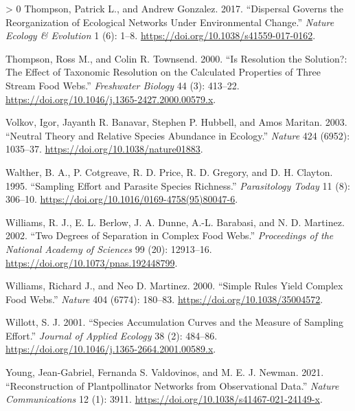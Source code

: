 \documentclass[11pt]{article}
\newlength{\cslhangindent}
\newenvironment{CSLReferences}[3] %
 {%
  \setlength{\parindent}{0pt}
  \ifodd #1 \everypar{\setlength{\hangindent}{\cslhangindent}}\ignorespaces\fi
  \ifnum #2 > 0
  \setlength{\parskip}{#2\baselineskip}
  \fi
 }%
 {}
\begin{document}
\begin{CSLReferences}{1}{0}
\leavevmode\hypertarget{ref-Thompson2017DisGov}{}%
Thompson, Patrick L., and Andrew Gonzalez. 2017. {``Dispersal Governs
the Reorganization of Ecological Networks Under Environmental Change.''}
\emph{Nature Ecology \& Evolution} 1 (6): 1--8.
\url{https://doi.org/10.1038/s41559-017-0162}.

\leavevmode\hypertarget{ref-Thompson2000ResSol}{}%
Thompson, Ross M., and Colin R. Townsend. 2000. {``Is Resolution the
Solution?: The Effect of Taxonomic Resolution on the Calculated
Properties of Three Stream Food Webs.''} \emph{Freshwater Biology} 44
(3): 413--22. \url{https://doi.org/10.1046/j.1365-2427.2000.00579.x}.

\leavevmode\hypertarget{ref-Volkov2003NeuThe}{}%
Volkov, Igor, Jayanth R. Banavar, Stephen P. Hubbell, and Amos Maritan.
2003. {``Neutral Theory and Relative Species Abundance in Ecology.''}
\emph{Nature} 424 (6952): 1035--37.
\url{https://doi.org/10.1038/nature01883}.

\leavevmode\hypertarget{ref-Walther1995SamEff}{}%
Walther, B. A., P. Cotgreave, R. D. Price, R. D. Gregory, and D. H.
Clayton. 1995. {``Sampling Effort and Parasite Species Richness.''}
\emph{Parasitology Today} 11 (8): 306--10.
\url{https://doi.org/10.1016/0169-4758(95)80047-6}.

\leavevmode\hypertarget{ref-Williams2002TwoDeg}{}%
Williams, R. J., E. L. Berlow, J. A. Dunne, A.-L. Barabasi, and N. D.
Martinez. 2002. {``Two Degrees of Separation in Complex Food Webs.''}
\emph{Proceedings of the National Academy of Sciences} 99 (20):
12913--16. \url{https://doi.org/10.1073/pnas.192448799}.

\leavevmode\hypertarget{ref-Williams2000SimRul}{}%
Williams, Richard J., and Neo D. Martinez. 2000. {``Simple Rules Yield
Complex Food Webs.''} \emph{Nature} 404 (6774): 180--83.
\url{https://doi.org/10.1038/35004572}.

\leavevmode\hypertarget{ref-Willott2001SpeAcc}{}%
Willott, S. J. 2001. {``Species Accumulation Curves and the Measure of
Sampling Effort.''} \emph{Journal of Applied Ecology} 38 (2): 484--86.
\url{https://doi.org/10.1046/j.1365-2664.2001.00589.x}.

\leavevmode\hypertarget{ref-Young2021RecPla}{}%
Young, Jean-Gabriel, Fernanda S. Valdovinos, and M. E. J. Newman. 2021.
{``Reconstruction of Plantpollinator Networks from Observational
Data.''} \emph{Nature Communications} 12 (1): 3911.
\url{https://doi.org/10.1038/s41467-021-24149-x}.

\end{CSLReferences}
\end{document}
